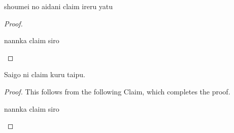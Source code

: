 \documentclass[a4paper,dvipsnames, 11pt]{amsart}
\begin{document}
\begin{theorem}
	shoumei no aidani claim ireru yatu
\end{theorem}
\begin{proof}
	\lipsum[1]
	\begin{claim}
		nannka claim siro
	\end{claim}
	\begin{since}
		\lipsum[2]
	\end{since}
	\lipsum[3]
\end{proof}
\begin{theorem}
	Saigo ni claim kuru taipu.
\end{theorem}
\begin{proof}
	\lipsum[1]
	This follows from the following Claim, which completes the proof.
	\qedhere
	\begin{claim}
		nannka claim siro
	\end{claim}
	\begin{since}
		\lipsum[2]
	\end{since}
\end{proof}



\end{document}
